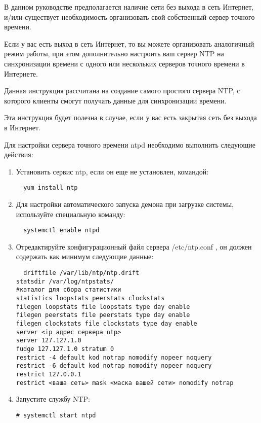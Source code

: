 \documentclass[a4paper,10pt,twoside]{article}
\begin{document}
В данном руководстве предполагается наличие сети без выхода в сеть Интернет, и/или существует необходимость организовать свой собственный сервер точного времени.

Если у вас есть выход в сеть Интернет, то вы можете организовать аналогичный режим работы, при этом дополнительно настроить ваш сервер NTP на синхронизации времени с одного или нескольких серверов точного времени в Интернете.

Данная инструкция рассчитана на создание самого простого сервера NTP, с которого клиенты смогут получать данные для синхронизации времени.

Эта инструкция будет полезна в случае, если у вас есть закрытая сеть без выхода в Интернет. 

Для настройки сервера точного времени ntpd необходимо выполнить следующие действия:

\begin{enumerate}
 \item Установить сервис ntp, если он еще не установлен, командой:\\
 \begin{verbatim}
  yum install ntp
 \end{verbatim}
 \item Для настройки автоматического запуска демона при загрузке системы, используйте специальную команду:\\
 \begin{verbatim}
  systemctl enable ntpd
 \end{verbatim}
 \item Отредактируйте конфигурационный файл сервера /etc/ntp.conf , он должен содержать как минимум следующие данные:\\
 \begin{verbatim}
  driftfile /var/lib/ntp/ntp.drift
statsdir /var/log/ntpstats/
#каталог для сбора статистики
statistics loopstats peerstats clockstats
filegen loopstats file loopstats type day enable
filegen peerstats file peerstats type day enable
filegen clockstats file clockstats type day enable
server <ip адрес сервера ntp>
server 127.127.1.0
fudge 127.127.1.0 stratum 0
restrict -4 default kod notrap nomodify nopeer noquery
restrict -6 default kod notrap nomodify nopeer noquery
restrict 127.0.0.1
restrict <ваша сеть> mask <маска вашей сети> nomodify notrap
 \end{verbatim} 
 \item Запустите службу NTP:\\
\begin{verbatim}
# systemctl start ntpd
\end{verbatim} 
\end{enumerate}
\end{document}
